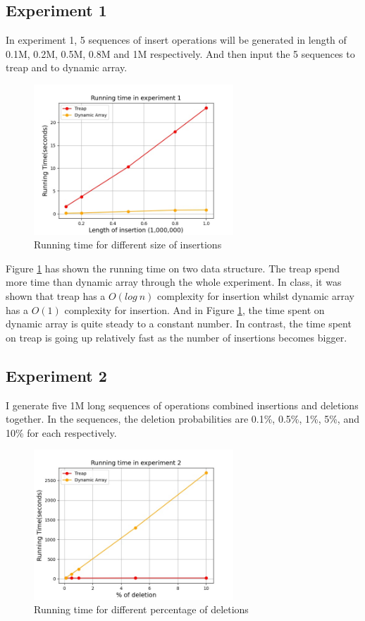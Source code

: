 \documentclass[11pt]{article}
\begin{document}
\subsection{Experiment 1}
In experiment 1, 5 sequences of insert operations will be generated in length of 0.1M, 0.2M, 0.5M, 0.8M and 1M respectively.
And then input the 5 sequences to treap and to dynamic array.
\begin{figure}
\centering
\includegraphics[width=7.5cm]{exp1.jpg} %
\caption{Running time for different size of insertions}\label{figure1} %
\end{figure}

Figure \ref{figure1} has shown the running time on two data structure. 
The treap spend more time than dynamic array through the whole experiment.
In class, it was shown that treap has a $O(log\ n)$ complexity for insertion whilst dynamic array has a $O(1)$ complexity for insertion.
And in Figure \ref{figure1}, the time spent on dynamic array is quite steady to a constant number.
In contrast, the time spent on treap is going up relatively fast as the number of insertions becomes bigger.

\subsection{Experiment 2}
I generate five 1M long sequences of operations combined insertions and deletions together.
In the sequences, the deletion probabilities are 0.1\%, 0.5\%, 1\%, 5\%, and 10\% for each respectively.

\begin{figure}
\centering
\includegraphics[width=7.5cm]{exp2.jpg} %
\caption{Running time for different percentage of deletions}\label{figure2} %
\end{figure}
\end{document}
